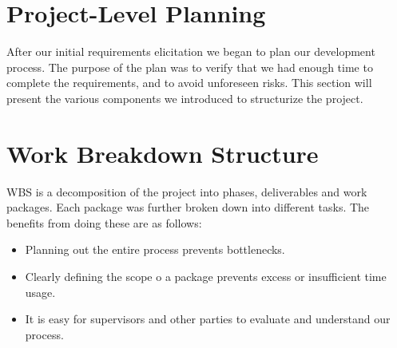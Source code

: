 \section{Project-Level Planning}
After our initial requirements elicitation we began to plan our
development process. The purpose of the plan was to verify that we had
enough time to complete the requirements, and to avoid unforeseen
risks. This section will present the various components we introduced
to structurize the project.

\section{Work Breakdown Structure}
WBS is a decomposition of the project into phases, deliverables and work
packages. Each package was further broken down into different tasks.
The benefits from doing these are as follows:
\begin{itemize}
    \item Planning out the entire process prevents bottlenecks.
    \item Clearly defining the scope o a package prevents excess or insufficient
        time usage. 
    \item It is easy for supervisors and other parties to evaluate and
        understand our process. 
\end{itemize}

